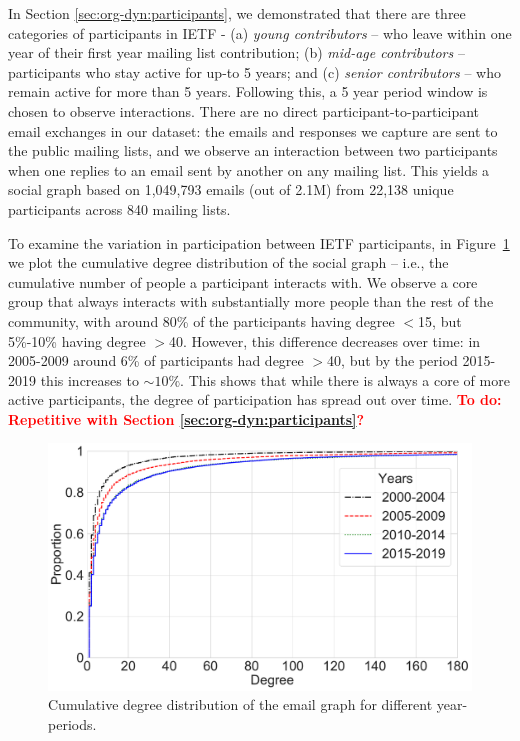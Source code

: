 \documentclass[twocolumn,10pt]{article}
\newlength{\figureWidthOneColumn}
\newcommand{\todo}[1]{\textbf{\textcolor{red}{To do: #1}}}
\newcommand{\pb}[1]{\vspace{0.75ex}\noindent{\textbf{#1}}}
\begin{document}
In Section \ref{sec:org-dyn:participants}, we demonstrated that there
are three categories of participants in IETF - (a) \textit{young
contributors} -- who leave within one year of their first year mailing list
contribution; (b) \textit{mid-age contributors} -- participants who stay
active for up-to 5 years; and (c) \textit{senior contributors} -- who
remain active for more than 5 years. Following this, a 5 year period window
is chosen to observe interactions. There are no direct
participant-to-participant email exchanges in our dataset: the emails and
responses we capture are sent to the public mailing lists, and we observe
an interaction between two participants when one replies to an email sent
by another on any mailing list. This yields a social graph based on
1,049,793 emails (out of 2.1M) from 22,138 unique participants across 840
mailing lists.

\pb{Participation}
To examine the variation in participation between IETF participants, in
Figure~\ref{fig:degree_cdf} we plot the cumulative degree distribution of
the social graph -- i.e., the cumulative number of people a participant
interacts with.  We observe a core group that always interacts with
substantially more people than the rest of the community, with around 80\%
of the participants having degree  $<$15, but 5\%-10\% having degree $>$40.
However,  this difference decreases over time: in 2005-2009 around 6\% of
participants had degree $>$40, but by the period 2015-2019 this increases
to $\sim10\%$.  This shows that while there is always a core of more active
participants, the degree of participation has spread  out over time.
\todo{Repetitive with Section \ref{sec:org-dyn:participants}?}

\begin{figure}
  \centering
  \includegraphics[width=\figureWidthOneColumn]{figures-prev/icwsm-2022/degree_CDF.pdf}
  \caption{
    Cumulative degree distribution of the email graph for different
    year-periods.
  }
  \label{fig:degree_cdf}
\end{figure}
\end{document}
